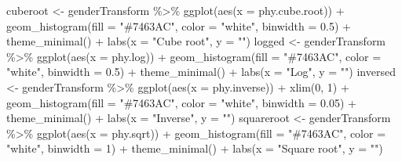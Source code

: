 \documentclass[
  letterpaper,
  DIV=11,
  numbers=noendperiod]{scrreprt}
\newenvironment{Shaded}{\begin{snugshade}}{\end{snugshade}}
\newcommand{\AttributeTok}[1]{\textcolor[rgb]{0.40,0.45,0.13}{#1}}
\newcommand{\DecValTok}[1]{\textcolor[rgb]{0.68,0.00,0.00}{#1}}
\newcommand{\FloatTok}[1]{\textcolor[rgb]{0.68,0.00,0.00}{#1}}
\newcommand{\FunctionTok}[1]{\textcolor[rgb]{0.28,0.35,0.67}{#1}}
\newcommand{\NormalTok}[1]{\textcolor[rgb]{0.00,0.23,0.31}{#1}}
\newcommand{\OtherTok}[1]{\textcolor[rgb]{0.00,0.23,0.31}{#1}}
\newcommand{\SpecialCharTok}[1]{\textcolor[rgb]{0.37,0.37,0.37}{#1}}
\newcommand{\StringTok}[1]{\textcolor[rgb]{0.13,0.47,0.30}{#1}}
\begin{document}
\begin{Shaded}
\begin{Highlighting}[]
\NormalTok{cuberoot }\OtherTok{\textless{}{-}}\NormalTok{ genderTransform }\SpecialCharTok{\%\textgreater{}\%}
    \FunctionTok{ggplot}\NormalTok{(}\FunctionTok{aes}\NormalTok{(}\AttributeTok{x =}\NormalTok{ phy.cube.root)) }\SpecialCharTok{+} \FunctionTok{geom\_histogram}\NormalTok{(}\AttributeTok{fill =} \StringTok{"\#7463AC"}\NormalTok{, }\AttributeTok{color =} \StringTok{"white"}\NormalTok{,}
    \AttributeTok{binwidth =} \FloatTok{0.5}\NormalTok{) }\SpecialCharTok{+} \FunctionTok{theme\_minimal}\NormalTok{() }\SpecialCharTok{+} \FunctionTok{labs}\NormalTok{(}\AttributeTok{x =} \StringTok{"Cube root"}\NormalTok{, }\AttributeTok{y =} \StringTok{""}\NormalTok{)}
\NormalTok{logged }\OtherTok{\textless{}{-}}\NormalTok{ genderTransform }\SpecialCharTok{\%\textgreater{}\%}
    \FunctionTok{ggplot}\NormalTok{(}\FunctionTok{aes}\NormalTok{(}\AttributeTok{x =}\NormalTok{ phy.log)) }\SpecialCharTok{+} \FunctionTok{geom\_histogram}\NormalTok{(}\AttributeTok{fill =} \StringTok{"\#7463AC"}\NormalTok{, }\AttributeTok{color =} \StringTok{"white"}\NormalTok{,}
    \AttributeTok{binwidth =} \FloatTok{0.5}\NormalTok{) }\SpecialCharTok{+} \FunctionTok{theme\_minimal}\NormalTok{() }\SpecialCharTok{+} \FunctionTok{labs}\NormalTok{(}\AttributeTok{x =} \StringTok{"Log"}\NormalTok{, }\AttributeTok{y =} \StringTok{""}\NormalTok{)}
\NormalTok{inversed }\OtherTok{\textless{}{-}}\NormalTok{ genderTransform }\SpecialCharTok{\%\textgreater{}\%}
    \FunctionTok{ggplot}\NormalTok{(}\FunctionTok{aes}\NormalTok{(}\AttributeTok{x =}\NormalTok{ phy.inverse)) }\SpecialCharTok{+} \FunctionTok{xlim}\NormalTok{(}\DecValTok{0}\NormalTok{, }\DecValTok{1}\NormalTok{) }\SpecialCharTok{+} \FunctionTok{geom\_histogram}\NormalTok{(}\AttributeTok{fill =} \StringTok{"\#7463AC"}\NormalTok{,}
    \AttributeTok{color =} \StringTok{"white"}\NormalTok{, }\AttributeTok{binwidth =} \FloatTok{0.05}\NormalTok{) }\SpecialCharTok{+} \FunctionTok{theme\_minimal}\NormalTok{() }\SpecialCharTok{+} \FunctionTok{labs}\NormalTok{(}\AttributeTok{x =} \StringTok{"Inverse"}\NormalTok{,}
    \AttributeTok{y =} \StringTok{""}\NormalTok{)}
\NormalTok{squareroot }\OtherTok{\textless{}{-}}\NormalTok{ genderTransform }\SpecialCharTok{\%\textgreater{}\%}
    \FunctionTok{ggplot}\NormalTok{(}\FunctionTok{aes}\NormalTok{(}\AttributeTok{x =}\NormalTok{ phy.sqrt)) }\SpecialCharTok{+} \FunctionTok{geom\_histogram}\NormalTok{(}\AttributeTok{fill =} \StringTok{"\#7463AC"}\NormalTok{, }\AttributeTok{color =} \StringTok{"white"}\NormalTok{,}
    \AttributeTok{binwidth =} \DecValTok{1}\NormalTok{) }\SpecialCharTok{+} \FunctionTok{theme\_minimal}\NormalTok{() }\SpecialCharTok{+} \FunctionTok{labs}\NormalTok{(}\AttributeTok{x =} \StringTok{"Square root"}\NormalTok{, }\AttributeTok{y =} \StringTok{""}\NormalTok{)}
\end{Highlighting}
\end{Shaded}
\end{document}
